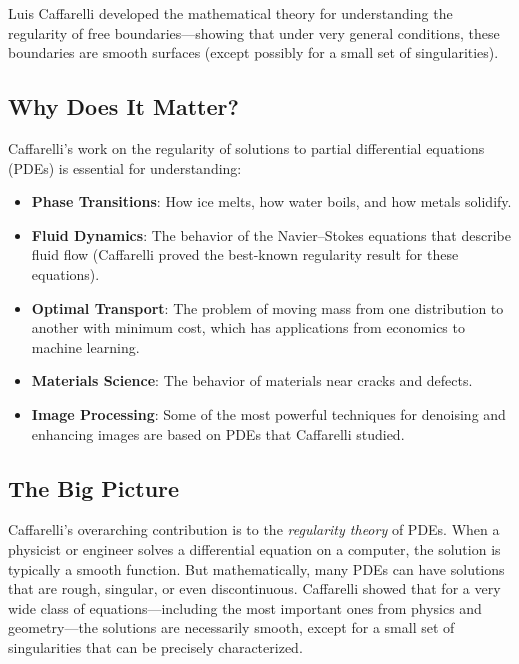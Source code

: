 Luis Caffarelli developed the mathematical theory for understanding the regularity of free boundaries---showing that under very general conditions, these boundaries are smooth surfaces (except possibly for a small set of singularities).

\subsection{Why Does It Matter?}

Caffarelli's work on the regularity of solutions to partial differential equations (PDEs) is essential for understanding:
\begin{itemize}
\item \textbf{Phase Transitions}: How ice melts, how water boils, and how metals solidify.
\item \textbf{Fluid Dynamics}: The behavior of the Navier--Stokes equations that describe fluid flow (Caffarelli proved the best-known regularity result for these equations).
\item \textbf{Optimal Transport}: The problem of moving mass from one distribution to another with minimum cost, which has applications from economics to machine learning.
\item \textbf{Materials Science}: The behavior of materials near cracks and defects.
\item \textbf{Image Processing}: Some of the most powerful techniques for denoising and enhancing images are based on PDEs that Caffarelli studied.
\end{itemize}

\subsection{The Big Picture}

Caffarelli's overarching contribution is to the \emph{regularity theory} of PDEs. When a physicist or engineer solves a differential equation on a computer, the solution is typically a smooth function. But mathematically, many PDEs can have solutions that are rough, singular, or even discontinuous. Caffarelli showed that for a very wide class of equations---including the most important ones from physics and geometry---the solutions are necessarily smooth, except for a small set of singularities that can be precisely characterized.


\begin{center}
\end{center}

